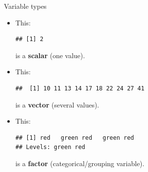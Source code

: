 \begin{frame}[fragile]{Variable types}
  
  \begin{itemize}
  \item This:
 
\begin{knitrout}
\color{fgcolor}\begin{kframe}
\begin{alltt}
\hlkwb{=}
\end{alltt}
\begin{verbatim}
## [1] 2
\end{verbatim}
\end{kframe}
\end{knitrout}
is a \textbf{scalar} (one value). 

\item This:
 
\begin{knitrout}
\color{fgcolor}\begin{kframe}
\begin{alltt}
\end{alltt}
\begin{verbatim}
##  [1] 10 11 13 14 17 18 22 24 27 41
\end{verbatim}
\end{kframe}
\end{knitrout}
is a \textbf{vector} (several values).
\item This:
 
\begin{knitrout}
\color{fgcolor}\begin{kframe}
\begin{alltt}
\end{alltt}
\begin{verbatim}
## [1] red   green red   green red  
## Levels: green red
\end{verbatim}
\end{kframe}
\end{knitrout}
is a \textbf{factor} (categorical/grouping variable).  

  \end{itemize}
  
\end{frame}

